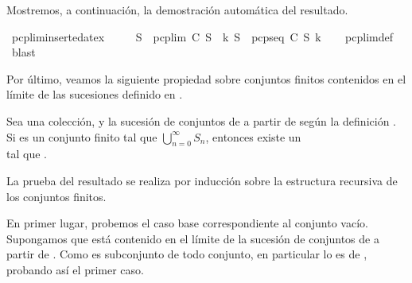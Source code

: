 \begin{isabellebody}
{\isafoldproof}%
%
\isadelimproof
%
\endisadelimproof
%
\begin{isamarkuptext}%
Mostremos, a continuación, la demostración automática del resultado.%
\end{isamarkuptext}\isamarkuptrue%
\isamarkupfalse%
\ pcp{\isacharunderscore}lim{\isacharunderscore}inserted{\isacharunderscore}at{\isacharunderscore}ex{\isacharcolon}\ \isanewline
\ \ \ \ {\isachardoublequoteopen}S{\isacharprime}\ {\isasymin}\ pcp{\isacharunderscore}lim\ C\ S\ {\isasymLongrightarrow}\ {\isasymexists}k{\isachardot}\ S{\isacharprime}\ {\isasymin}\ pcp{\isacharunderscore}seq\ C\ S\ k{\isachardoublequoteclose}\isanewline
%
\isadelimproof
\ \ %
\endisadelimproof
%
\isatagproof
{}\isamarkupfalse%
\ pcp{\isacharunderscore}lim{\isacharunderscore}def\ \isamarkupfalse%
\ blast%
\endisatagproof
{\isafoldproof}%
%
\isadelimproof
%
\endisadelimproof
%
\begin{isamarkuptext}%
Por último, veamos la siguiente propiedad sobre conjuntos finitos contenidos en el límite de 
  las sucesiones definido en .

\begin{lema}
  Sea  una colección,  y  la sucesión de conjuntos de  a partir de  según la
  definición . Si  es un conjunto finito tal que  $\bigcup_{n = 0}^{\infty} S_{n}$, 
  entonces existe un\\  tal que .
\end{lema}

\begin{demostracion}
  La prueba del resultado se realiza por inducción sobre la estructura recursiva de los conjuntos 
  finitos.

  En primer lugar, probemos el caso base correspondiente al conjunto vacío. Supongamos que \isa{{\isacharbraceleft}{\isacharbraceright}} está 
  contenido en el límite de la sucesión de conjuntos de  a partir de . Como \isa{{\isacharbraceleft}{\isacharbraceright}} es 
  subconjunto de todo conjunto, en particular lo es de , probando así el primer caso.


\end{demostracion}
\end{isamarkuptext}
\end{isabellebody}

